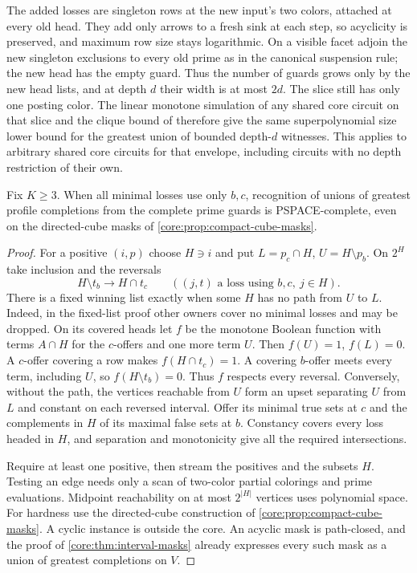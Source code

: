 The added losses are singleton rows at the new
input's two colors, attached at every old head.
They add only arrows to a fresh sink at each
step, so acyclicity is preserved, and maximum
row size stays logarithmic. On a visible facet
adjoin the new singleton exclusions to every
old prime as in the canonical suspension rule;
the new head has the empty guard. Thus the
number of guards grows only by the new
head lists, and at depth $d$ their width is
at most $2d$. The slice still has only one
posting color. The linear monotone simulation
of any shared core circuit on that slice and
the clique bound of \cite{AlonBoppana1987}
therefore give the same superpolynomial size
lower bound for the greatest union of bounded
depth-$d$ witnesses. This applies to arbitrary
shared core circuits for that envelope, including
circuits with no depth restriction of their own.

\begin{corollary}
\label{core:cor:fixed-offer-prime-space}
Fix $K\ge3$. When all minimal losses use only $b,c$, recognition of
unions of greatest profile completions from the complete prime guards
is PSPACE-complete, even on the directed-cube masks of
\cref{core:prop:compact-cube-masks}.
\end{corollary}
\begin{proof}
For a positive $(i,p)$ choose $H\ni i$ and put
$L=p_c\cap H$, $U=H\setminus p_b$. On $2^H$ take inclusion and the
reversals
\[
     H\setminus t_b\longrightarrow H\cap t_c
       \qquad ((j,t)\text{ a loss using }b,c,\ j\in H).
\]
There is a fixed winning list exactly when some $H$ has no path
from $U$ to $L$. Indeed, in the fixed-list proof other owners cover
no minimal losses and may be dropped. On its covered heads let $f$
be the monotone Boolean function with terms $A\cap H$ for the
$c$-offers and one more term $U$. Then $f(U)=1$, $f(L)=0$.
A $c$-offer covering a row makes $f(H\cap t_c)=1$.
A covering $b$-offer meets every term, including $U$, so
$f(H\setminus t_b)=0$. Thus $f$ respects every reversal.
Conversely, without the path, the vertices reachable from $U$
form an upset separating $U$ from $L$ and constant on each reversed
interval. Offer its minimal true sets at $c$ and the complements in
$H$ of its maximal false sets at $b$. Constancy covers every loss
headed in $H$, and separation and monotonicity give all the required
intersections.

Require at least one positive, then stream the positives and the subsets $H$. Testing an edge needs
only a scan of two-color partial colorings and prime evaluations.
Midpoint reachability on at most $2^{|H|}$ vertices uses polynomial
space. For hardness use the directed-cube construction of
\cref{core:prop:compact-cube-masks}. A cyclic instance is outside
the core. An acyclic mask is path-closed, and the proof of
\cref{core:thm:interval-masks} already expresses every such mask as
a union of greatest completions on $V$.
\end{proof}

